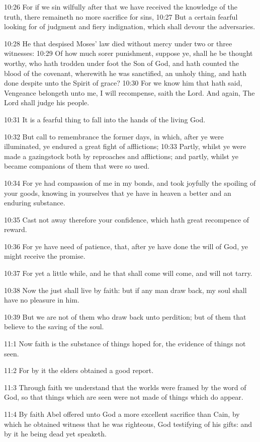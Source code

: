 10:26 For if we sin wilfully after that we have received the knowledge of the truth, there remaineth no more sacrifice for sins, 10:27 But a certain fearful looking for of judgment and fiery indignation, which shall devour the adversaries.

10:28 He that despised Moses' law died without mercy under two or three witnesses: 10:29 Of how much sorer punishment, suppose ye, shall he be thought worthy, who hath trodden under foot the Son of God, and hath counted the blood of the covenant, wherewith he was sanctified, an unholy thing, and hath done despite unto the Spirit of grace?  10:30 For we know him that hath said, Vengeance belongeth unto me, I will recompense, saith the Lord. And again, The Lord shall judge his people.

10:31 It is a fearful thing to fall into the hands of the living God.

10:32 But call to remembrance the former days, in which, after ye were illuminated, ye endured a great fight of afflictions; 10:33 Partly, whilst ye were made a gazingstock both by reproaches and afflictions; and partly, whilst ye became companions of them that were so used.

10:34 For ye had compassion of me in my bonds, and took joyfully the spoiling of your goods, knowing in yourselves that ye have in heaven a better and an enduring substance.

10:35 Cast not away therefore your confidence, which hath great recompence of reward.

10:36 For ye have need of patience, that, after ye have done the will of God, ye might receive the promise.

10:37 For yet a little while, and he that shall come will come, and will not tarry.

10:38 Now the just shall live by faith: but if any man draw back, my soul shall have no pleasure in him.

10:39 But we are not of them who draw back unto perdition; but of them that believe to the saving of the soul.

11:1 Now faith is the substance of things hoped for, the evidence of things not seen.

11:2 For by it the elders obtained a good report.

11:3 Through faith we understand that the worlds were framed by the word of God, so that things which are seen were not made of things which do appear.

11:4 By faith Abel offered unto God a more excellent sacrifice than Cain, by which he obtained witness that he was righteous, God testifying of his gifts: and by it he being dead yet speaketh.

